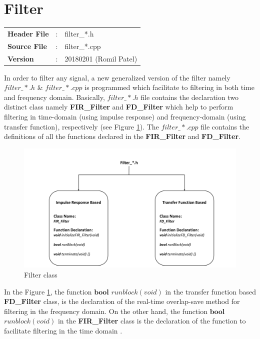 \section{Filter}
\begin{tcolorbox}	
	\begin{tabular}{p{2.75cm} p{0.2cm} p{10.5cm}}
		\textbf{Header File}   &:& filter\_*.h \\
		\textbf{Source File}   &:& filter\_*.cpp \\
		\textbf{Version}       &:& 20180201 (Romil Patel)
	\end{tabular}
\end{tcolorbox}
In order to filter any signal, a new generalized version of the filter namely $filter\_*.h$ \& $filter\_*.cpp$ is programmed which facilitate to filtering in both time and frequency domain. Basically, $filter\_*.h$ file contains the declaration two distinct class namely \textbf{FIR\_Filter} and \textbf{FD\_Filter} which help to perform filtering in time-domain (using impulse response) and frequency-domain (using transfer function), respectively (see Figure \ref{FilterClass}). The $filter\_*.cpp$ file contains the definitions of all the functions declared in the  \textbf{FIR\_Filter} and \textbf{FD\_Filter}.\\
\begin{figure}[h]
	\centering
	\includegraphics[width=16cm]{./algorithms/filter/figures/Filter_class.pdf}
	\caption{Filter class}
	\label{FilterClass}
\end{figure}
In the Figure \ref{FilterClass}, the function $\textbf{bool}$ $runblock(void)$ in the transfer function based \textbf{FD\_Filter} class, is the declaration of the real-time overlap-save method for filtering in the frequency domain. On the other hand, the function  $\textbf{bool}$ $runblock(void)$ in the \textbf{FIR\_Filter} class is the declaration of the function to facilitate filtering in the time domain \cite{Kuo,Rappaport2002} .\\
